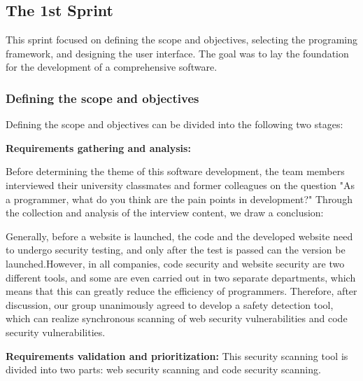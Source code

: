 \documentclass[journal]{IEEEtran}
\begin{document}
\subsection{The 1st Sprint}

This sprint focused on defining the scope and objectives, selecting the programing framework, and designing the user interface. The goal was to lay the foundation for the development of a comprehensive software.

\subsubsection{Defining the scope and objectives}

Defining the scope and objectives can be divided into the following two stages:

\textbf{Requirements gathering and analysis:}

Before determining the theme of this software development, the team members interviewed their university classmates and former colleagues on the question "As a programmer, what do you think are the pain points in development?" Through the collection and analysis of the interview content, we draw a conclusion: 

Generally, before a website is launched, the code and the developed website need to undergo security testing, and only after the test is passed can the version be launched.However, in all companies, code security and website security are two different tools, and some are even carried out in two separate departments, which means that this can greatly reduce the efficiency of programmers. Therefore, after discussion, our group unanimously agreed to develop a safety detection tool, which can realize synchronous scanning of web security vulnerabilities and code security vulnerabilities.

\textbf{Requirements validation and prioritization:}
This security scanning tool is divided into two parts: web security scanning and code security scanning. 
\end{document}

